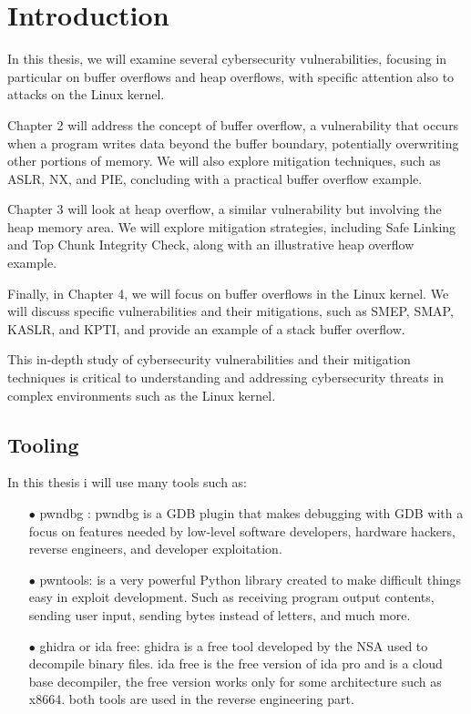 \chapter{Introduction}
In this thesis, we will examine several cybersecurity vulnerabilities, focusing in particular on buffer overflows and heap overflows, with specific attention also to attacks on the Linux kernel.\newline

Chapter 2 will address the concept of buffer overflow, a vulnerability that occurs when a program writes data beyond the buffer boundary, potentially overwriting other portions of memory. We will also explore mitigation techniques, such as ASLR, NX, and PIE, concluding with a practical buffer overflow example.\newline

Chapter 3 will look at heap overflow, a similar vulnerability but involving the heap memory area. We will explore mitigation strategies, including Safe Linking and Top Chunk Integrity Check, along with an illustrative heap overflow example.\newline

Finally, in Chapter 4, we will focus on buffer overflows in the Linux kernel. We will discuss specific vulnerabilities and their mitigations, such as SMEP, SMAP, KASLR, and KPTI, and provide an example of a stack buffer overflow.\newline

This in-depth study of cybersecurity vulnerabilities and their mitigation techniques is critical to understanding and addressing cybersecurity threats in complex environments such as the Linux kernel.\newline

\section{Tooling}
In this thesis i will use many tools such as: 
   \begin{itemize}
    \item[$\bullet$] pwndbg : pwndbg is a GDB plugin that makes debugging with GDB with a focus on features needed by low-level software developers, hardware hackers, reverse engineers, and developer exploitation.\newline
    \item[$\bullet$]pwntools: is a very powerful Python library created to make difficult things easy in exploit development.\newline
    Such as receiving program output contents, sending user input, sending bytes instead of letters, and much more.\newline
    \item[$\bullet$] ghidra or ida free: 
    ghidra is a free tool developed by the NSA used to decompile binary files.
    ida free is the free version of ida pro and is a cloud base decompiler, the free version works only for some architecture such as x8664.\newline
    both tools are used in the reverse engineering part.\newline
\end{itemize}